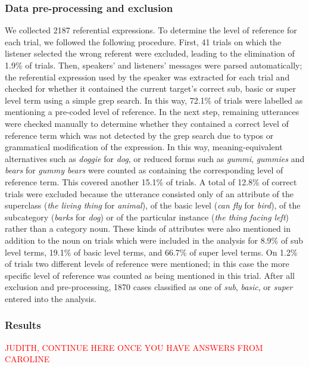 \documentclass[11pt]{article}
\newcommand{\red}[1]{\textcolor{Red}{#1}}
\begin{document}
\subsubsection{Data pre-processing and exclusion}

We collected 2187 referential expressions. To determine the level of reference for each trial, we followed the following procedure. First, 41 trials on which the listener selected the wrong referent were excluded, leading to the elimination of 1.9\% of trials. Then, speakers' and listeners' messages were parsed automatically; the referential expression used by the speaker was extracted for each trial and checked for whether it contained the current target's correct sub, basic or super level term using a simple grep search. In this way, 72.1\% of trials were labelled as mentioning a pre-coded level of reference. In the next step, remaining utterances were checked manually to determine whether they contained a correct level of reference term which was not detected by the grep search due to typos or grammatical modification of the expression. In this way, meaning-equivalent alternatives such as \emph{doggie} for \emph{dog}, or reduced forms such as \emph{gummi}, \emph{gummies} and \emph{bears} for \emph{gummy bears} were counted as containing the corresponding level of reference term. This covered another 15.1\% of trials. A total of 12.8\% of correct trials were excluded because the utterance consisted only of an attribute of the superclass (\emph{the living thing} for \emph{animal}), of the basic level (\emph{can fly} for \emph{bird}), of the subcategory (\emph{barks} for \emph{dog}) or of the particular instance (\emph{the thing facing left}) rather than a category noun. These kinds of attributes were also mentioned in addition to the noun on trials which were included in the analysis for 8.9\% of sub level terms, 19.1\% of basic level terms, and 66.7\% of super level terms. On 1.2\% of trials two different levels of reference were mentioned; in this case the more specific level of reference was counted as being mentioned in this trial. After all exclusion and pre-processing, 1870 cases classified as one of \emph{sub}, \emph{basic}, or \emph{super} entered into the analysis.



\subsubsection{Results}

\red{JUDITH, CONTINUE HERE ONCE YOU HAVE ANSWERS FROM CAROLINE}
\end{document}
